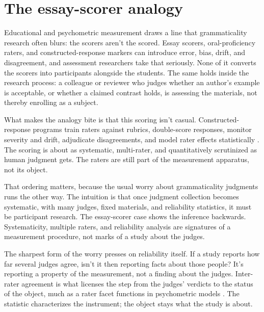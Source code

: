 \section{The essay-scorer analogy}
\label{sec:essay-evaluator}

Educational and psychometric measurement draws a line that grammaticality research often blurs: the scorers aren't the scored. Essay scorers, oral-proficiency raters, and constructed-response markers can introduce error, bias, drift, and disagreement, and assessment researchers take that seriously. None of it converts the scorers into participants alongside the students. The same holds inside the research process: a colleague or reviewer who judges whether an author's example is acceptable, or whether a claimed contrast holds, is assessing the materials, not thereby enrolling as a subject.

What makes the analogy bite is that this scoring isn't casual. Constructed-response programs train raters against rubrics, double-score responses, monitor severity and drift, adjudicate disagreements, and model rater effects statistically \citep{mccaffrey2022scoring,aera2014standards}. The scoring is about as systematic, multi-rater, and quantitatively scrutinized as human judgment gets. The raters are still part of the measurement apparatus, not its object.

That ordering matters, because the usual worry about grammaticality judgments runs the other way. The intuition is that once judgment collection becomes systematic, with many judges, fixed materials, and reliability statistics, it must be participant research. The essay-scorer case shows the inference backwards. Systematicity, multiple raters, and reliability analysis are signatures of a measurement procedure, not marks of a study about the judges.

The sharpest form of the worry presses on reliability itself. If a study reports how far several judges agree, isn't it then reporting facts about those people? It's reporting a property of the measurement, not a finding about the judges. Inter-rater agreement is what licenses the step from the judges' verdicts to the status of the object, much as a rater facet functions in psychometric models \citep{aera2014standards}. The statistic characterizes the instrument; the object stays what the study is about.

